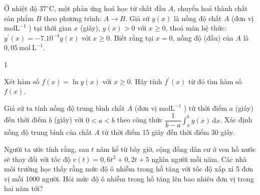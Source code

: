 \begin{vd}
	Ở nhiệt độ $37^{\circ} \mathrm{C}$, một phản ứng hoá học từ chất đầu $A$, chuyển hoá thành chất sản phẩm $B$ theo phương trình: $A \rightarrow B$. Giả sử $y(x)$ là nồng độ chất $A$ (đơn vị $\mathrm{mol} \mathrm{L}^{-1}$ ) tại thời gian $x$ (giây), $y(x)>0$ với $x \geq 0$, thoả mãn hệ thức: $y^{\prime}(x)=-7.10^{-4} y(x)$ với $x \geq 0$. Biết rằng tại $x=0$, nồng độ (đầu) của $A$ là $0,05 \mathrm{~mol} \mathrm{~L}^{-1}$. 
	\begin{enumEX}[a)]{1}
		\item Xét hàm số $f(x)=\ln y(x)$ với $x \geq 0$. Hãy tính $f^{\prime}(x)$ từ đó tìm hàm số $f(x)$.
		\item Giả sử ta tính nồng độ trung bình chất $A$ (đơn vị $\mathrm{mol} \mathrm{L}^{-1}$ ) từ thời điểm $a$ (giây) đến thời điểm $b$ (giây) với $0<a<b$ theo công thức $\dfrac{1}{b-a} \displaystyle\int_a^b y(x) \mathrm{\,d} x$.	Xác định nồng độ trung bình của chất $A$ từ thời điểm 15 giây đến thời điểm 30 giây.
	\end{enumEX}
\end{vd}
\begin{vd}
	Người ta ước tính rằng, sau $t$ năm kể từ bây giờ, cộng đồng dân cư ở ven hồ nước sẽ thay đổi với tốc độ $v(t)=0,6t^2+0,2t+5$ nghìn người mỗi năm. Các nhà môi trường học thấy rằng mức độ ô nhiễm trong hồ tăng với tốc độ xấp xỉ 5 đơn vị mỗi 1000 người. Hỏi mức độ ô nhiễm trong hồ tăng lên bao nhiêu đơn vị trong hai năm tới?
\end{vd}
